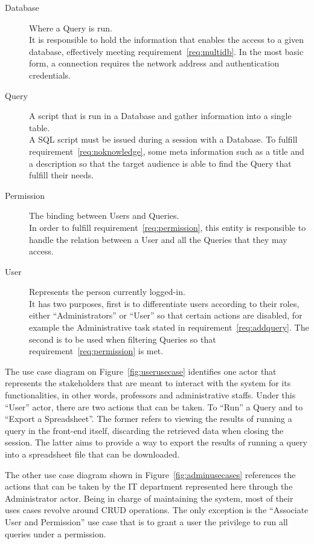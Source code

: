 \begin{description}
\item[Database] Where a Query is run.\\
  It is responsible to hold the information that enables the access to a given database, effectively meeting requirement~\ref{req:multidb}.
  In the most basic form, a connection requires the network address and authentication credentials.
\item[Query] A script that is run in a Database and gather information into a single table.\label{model:query}\\
  A \gls{SQL} script must be issued during a session with a Database.
  To fulfill requirement~\ref{req:noknowledge}, some meta information such as a title and a description so that the target audience is able to find the Query that fulfill their needs.
\item[Permission] The binding between Users and Queries.\\
  In order to fulfill requirement~\ref{req:permission}, this entity is responsible to handle the relation between a User and all the Queries that they may access.
\item[User] Represents the person currently logged-in.\\
  It has two purposes, first is to differentiate users according to their roles, either ``Administrators'' or ``User'' so that certain actions are disabled, for example the Administrative task stated in requirement~\ref{req:addquery}.
  The second is to be used when filtering Queries so that requirement~\ref{req:permission} is met.
\end{description}

The use case diagram on Figure~\ref{fig:userusecase} identifies one actor that represents the stakeholders that are meant to interact with the system for its functionalities, in other words,  professors and administrative staffs. Under this ``User'' actor, there are two actions that can be taken. To ``Run'' a Query and to ``Export a Spreadsheet''. The former refers to viewing the results of running a query in the front-end itself, discarding the retrieved data when closing the session. The latter aims to provide a way to export the results of running a query into a spreadsheet file that can be downloaded.

The other use case diagram shown in Figure~\ref{fig:adminusecases} references the actions that can be taken by the \gls{IT} department represented here through the Administrator actor. Being in charge of maintaining the system, most of their uses cases revolve around \gls{CRUD} operations. The only exception is the ``Associate User and Permission'' use case that is to grant a user the privilege to run all queries under a permission.

